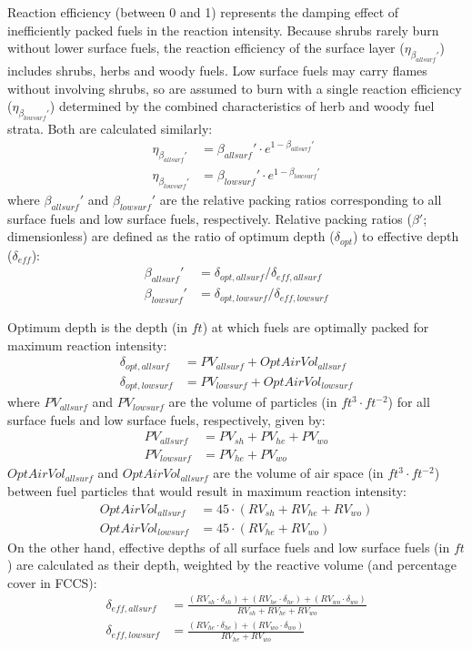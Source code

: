 \documentclass[]{book}
\begin{document}
Reaction efficiency (between 0 and 1) represents the damping effect of inefficiently packed fuels in the reaction intensity. Because shrubs rarely burn without lower surface fuels, the reaction efficiency of the surface layer (\(\eta_{\beta_{allsurf}'}\)) includes shrubs, herbs and woody fuels. Low surface fuels may carry flames without involving shrubs, so are assumed to burn with a single reaction efficiency (\(\eta_{\beta_{lowsurf}'}\)) determined by the combined characteristics of herb and woody fuel strata. Both are calculated similarly:
\begin{eqnarray} 
\eta_{\beta_{allsurf}'} &= \beta_{allsurf}'\cdot e^{1- \beta_{allsurf}'}\\
\eta_{\beta_{lowsurf}'} &=\beta_{lowsurf}'\cdot e^{1- \beta_{lowsurf}'}
\label{eq:reacteff}
\end{eqnarray}
where \(\beta_{allsurf}'\) and \(\beta_{lowsurf}'\) are the relative packing ratios corresponding to all surface fuels and low surface fuels, respectively. Relative packing ratios (\(\beta'\); dimensionless) are defined as the ratio of optimum depth (\(\delta_{opt}\)) to effective depth (\(\delta_{eff}\)):
\begin{eqnarray} 
\beta_{allsurf}' &= \delta_{opt, allsurf} / \delta_{eff, allsurf} \\
\beta_{lowsurf}' &= \delta_{opt, lowsurf} / \delta_{eff, lowsurf}
\label{eq:relpacking}
\end{eqnarray}

Optimum depth is the depth (in \(ft\)) at which fuels are optimally packed for maximum reaction intensity:
\begin{eqnarray}
\delta_{opt, allsurf} &= PV_{allsurf} +OptAirVol_{allsurf}\\
\delta_{opt, lowsurf} &= PV_{lowsurf} +OptAirVol_{lowsurf}
\end{eqnarray}
where \(PV_{allsurf}\) and \(PV_{lowsurf}\) are the volume of particles (in \(ft^3 \cdot ft^{-2}\)) for all surface fuels and low surface fuels, respectively, given by:
\begin{eqnarray}
PV_{allsurf} &= PV_{sh} + PV_{he} + PV_{wo}\\
PV_{lowsurf} &= PV_{he} + PV_{wo}
\end{eqnarray}
\(OptAirVol_{allsurf}\) and \(OptAirVol_{allsurf}\) are the volume of air space (in \(ft^3 \cdot ft^{-2}\)) between fuel particles that would result in maximum reaction intensity:
\begin{eqnarray}
OptAirVol_{allsurf} &= 45\cdot (RV_{sh} + RV_{he} + RV_{wo})\\
OptAirVol_{lowsurf} &= 45\cdot (RV_{he} + RV_{wo})
\end{eqnarray}
On the other hand, effective depths of all surface fuels and low surface fuels (in \(ft\)) are calculated as their depth, weighted by the reactive volume (and percentage cover in FCCS):
\begin{eqnarray}
\delta_{eff, allsurf} &= \frac{(RV_{sh}\cdot \delta_{sh}) +(RV_{he}\cdot \delta_{he}) + (RV_{wo}\cdot \delta_{wo})}{RV_{sh} +RV_{he}+RV_{wo}}\\
\delta_{eff, lowsurf} &= \frac{(RV_{he}\cdot \delta_{he}) + (RV_{wo}\cdot \delta_{wo})}{RV_{he}+RV_{wo}}
\end{eqnarray}
\end{document}
